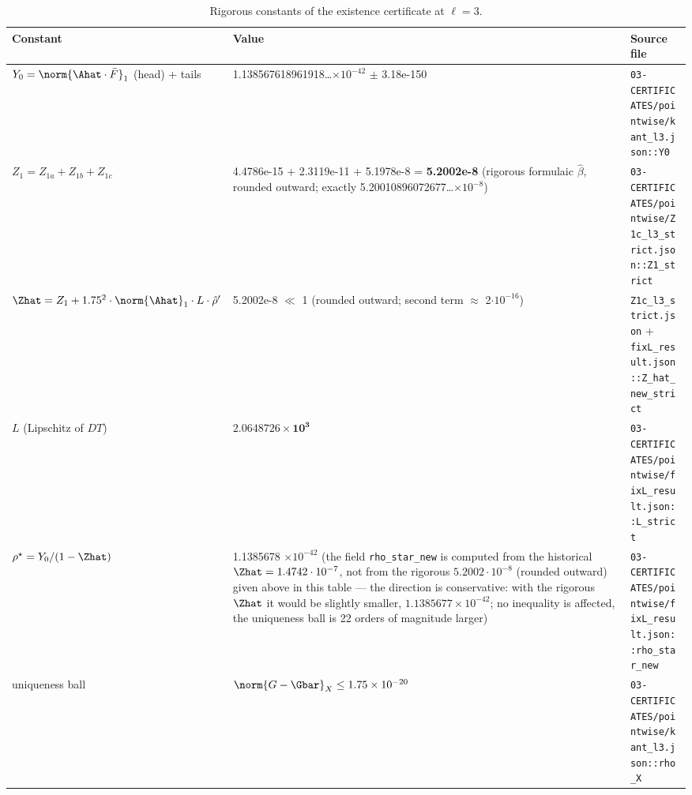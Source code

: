 \begin{table}[htbp]
\centering
\small
\caption{Rigorous constants of the existence certificate at $\ell=3$.}
\label{tab:5.1.1-constants}
\begin{tabular}{p{} p{} p{}}
\toprule
Constant & Value & Source file \\
\midrule
$Y_0 = \norm{\Ahat\cdot \bar{F}}_1$ (head) + tails &
1.138567618961918\ldots$\times 10^{-42}$ $\pm$ 3.18e-150 &
\texttt{03-\allowbreak CERTIFICATES/\allowbreak pointwise/\allowbreak kant\_\allowbreak l3.json\allowbreak ::\allowbreak Y0} \\
$Z_1 = Z_{1a}+Z_{1b}+Z_{1c}$ &
4.4786e-15 + 2.3119e-11 + 5.1978e-8 = \textbf{5.2002e-8} (rigorous formulaic
$\hat{\beta}$, rounded outward; exactly 5.20010896072677\ldots$\times 10^{-8}$) &
\texttt{03-\allowbreak CERTIFICATES/\allowbreak pointwise/\allowbreak Z1c\_\allowbreak l3\_\allowbreak strict.json\allowbreak ::\allowbreak Z1\_\allowbreak strict} \\
$\Zhat = Z_1 + 1.75^{2}\cdot \norm{\Ahat}_1\cdot L\cdot \hat{\rho}'$ &
5.2002e-8 $\ll$ 1 (rounded outward; second term $\approx$ 2$\cdot 10^{-16}$) &
\texttt{Z1c\_\allowbreak l3\_\allowbreak strict.json} + \texttt{fixL\_\allowbreak result.json\allowbreak ::\allowbreak Z\_\allowbreak hat\_\allowbreak new\_\allowbreak strict} \\
$L$ (Lipschitz of $DT$) & $\mathbf{2.0648726\times 10^3}$ &
\texttt{03-\allowbreak CERTIFICATES/\allowbreak pointwise/\allowbreak fixL\_\allowbreak result.json\allowbreak ::\allowbreak L\_\allowbreak strict} \\
$\rho^{\star} = Y_0 / (1-\Zhat)$ &
1.1385678 $\times 10^{-42}$ (the field \texttt{rho\_\allowbreak star\_\allowbreak new} is computed from
the historical $\Zhat = 1.4742\cdot 10^{-7}$, not from the rigorous $5.2002\cdot 10^{-8}$ (rounded
outward) given above in this table --- the direction is conservative: with the
rigorous $\Zhat$ it would be slightly smaller, $1.1385677\times 10^{-42}$; no
inequality is affected, the uniqueness ball is 22 orders of magnitude larger) &
\texttt{03-\allowbreak CERTIFICATES/\allowbreak pointwise/\allowbreak fixL\_\allowbreak result.json\allowbreak ::\allowbreak rho\_\allowbreak star\_\allowbreak new} \\
uniqueness ball &
$\norm{G-\Gbar}_X \le 1.75\times 10^{-20}$ &
\texttt{03-\allowbreak CERTIFICATES/\allowbreak pointwise/\allowbreak kant\_\allowbreak l3.json\allowbreak ::\allowbreak rho\_\allowbreak X} \\
\bottomrule
\end{tabular}
\end{table}

